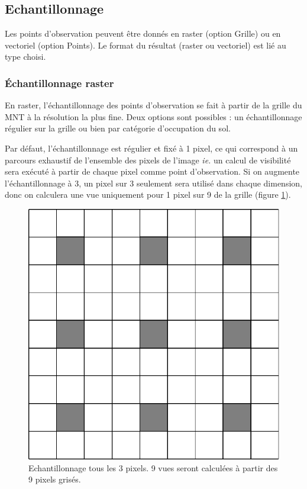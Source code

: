 \documentclass{report}
\begin{document}
\subsection{Echantillonnage}
\label{sampling}
Les points d'observation peuvent être donnés en raster (option Grille) ou en vectoriel (option Points). Le format du résultat (raster ou vectoriel) est lié au type choisi.

\subsubsection{Échantillonnage raster}
En raster, l'échantillonnage des points d'observation se fait à partir de la grille du MNT à la résolution la plus fine. Deux options sont possibles : un échantillonnage régulier sur la grille ou bien par catégorie d'occupation du sol.

Par défaut, l'échantillonnage est régulier et fixé à 1 pixel, ce qui correspond à un parcours exhaustif de l'ensemble des pixels de l'image \textit{ie.} un calcul de visibilité sera exécuté à partir de chaque pixel comme point d'observation. Si on augmente l'échantillonnage à 3, un pixel sur 3 seulement sera utilisé dans chaque dimension, donc on calculera une vue uniquement pour 1 pixel sur 9 de la grille (figure \ref{grid_sampling}).

\begin{figure}[H]
	\includegraphics[scale=0.5]{img/grid_sampling.pdf} 
	\caption{Echantillonnage tous les 3 pixels. 9 vues seront calculées à partir des 9 pixels grisés.}
	\label{grid_sampling}
\end{figure}
\end{document}
